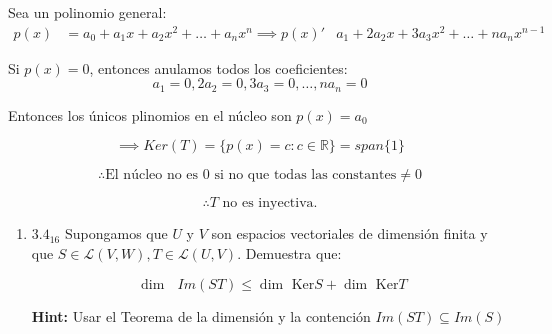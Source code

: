 \documentclass{article}
\begin{document}
\begin{enumerate}
			Sea un polinomio general:
			\begin{equation*}
				\begin{aligned}
					p(x)&=a_0+a_1x+a_2x^2+\dots+a_{n}x^n
					\implies p(x)' &a_1+2a_2x+3a_3x^2+\dots+na_nx^{n-1}
				\end{aligned}
			\end{equation*}
			
			Si \(p(x)=0\), entonces anulamos todos los coeficientes:
			\begin{equation*}
				a_1=0, 2a_2=0, 3a_3=0,\dots,na_{n}=0
			\end{equation*}
			
			Entonces los únicos plinomios en el núcleo son \(p(x)=a_0\)
			
			\[
			\implies Ker(T)=\{p(x)=c : c\in \mathbb{R} \}=span\{1\}
			\]
			
			\[
			\therefore \text{El núcleo no es }0\text{ si no que todas las constantes}\neq 0 
			\]
			
			\[
			\boxed{\therefore T \text{ no es inyectiva.} }
			\]
			
		\end{enumerate}
		
		\begin{enumerate}
			
			\item[] \(3.4_{16}\) Supongamos que \(U\) y \(V\) son espacios vectoriales de dimensión finita y que \(S\in\mathscr{L}(V,W), T\in\mathscr{L}(U,V)\). Demuestra que:
			
			\begin{equation*}
				\dim\text{ }Im(ST) \leq \dim\text{ Ker}S + \dim\text{ Ker}T
			\end{equation*}
			
			\textbf{Hint:} Usar el Teorema de la dimensión y la contención \(Im(ST) \subseteq Im(S)\)
			
		\end{enumerate}
		
\end{document}
